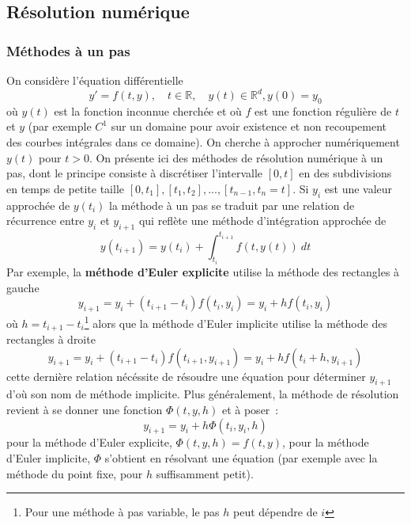 \documentclass[a4paper,11pt]{article}
\begin{document}
\begin{giacjshere}
\subsection{Résolution numérique}
\subsubsection{Méthodes à un pas}
On considère l'équation différentielle 
$$y'=f(t,y), \quad t \in \mathbb{R}, \quad y(t) \in \mathbb{R}^d, y(0)=y_0$$ 
o\`u $y(t)$ est la fonction inconnue cherchée
et où $f$ est une fonction régulière de $t$ et $y$ (par exemple
$C^1$ sur un domaine pour avoir existence et non recoupement des courbes
int\'egrales dans ce domaine).  On cherche
à approcher numériquement $y(t)$ pour $t>0$. 
On présente ici des méthodes de résolution numérique à un pas,
dont le principe consiste à discrétiser l'intervalle $[0,t]$ en des
subdivisions en temps de petite taille $[0,t_1], [t_1,t_2], ..., 
[t_{n-1},t_n=t]$. Si $y_i$ est une valeur approchée de $y(t_i)$
la méthode à un pas se traduit par une relation de récurrence entre
$y_i$ et $y_{i+1}$ qui reflète une méthode d'intégration
approchée de
$$ y(t_{i+1})=y(t_i)+\int_{t_i}^{t_{i+1}} f(t,y(t)) \ dt$$
Par exemple, la {\bf méthode d'Euler explicite} 
utilise la méthode des
rectangles à gauche
$$ y_{i+1} = y_i + (t_{i+1}-t_i) f(t_i,y_i)=y_i+hf(t_i,y_i)$$
o\`u $h=t_{i+1}-t_i$\footnote{Pour une m\'ethode \`a pas variable,
le pas $h$ peut d\'ependre de $i$} 
alors que la méthode d'Euler implicite utilise la méthode 
des rectangles à droite
$$ y_{i+1} = y_i + (t_{i+1}-t_i) f(t_{i+1},y_{i+1})=y_i+hf(t_{i}+h,y_{i+1})$$
cette dernière relation nécéssite de résoudre une équation pour
déterminer $y_{i+1}$ d'où son nom de méthode implicite.
Plus g\'en\'eralement, la m\'ethode de r\'esolution revient \`a
se donner une fonction $\Phi(t,y,h)$ et \`a poser~:
$$ y_{i+1}=y_i+h\Phi(t_i,y_i,h)$$
pour la m\'ethode d'Euler explicite, $\Phi(t,y,h)=f(t,y)$, pour
la m\'ethode d'Euler implicite, $\Phi$ s'obtient en r\'esolvant une 
\'equation (par exemple avec la m\'ethode du point fixe, pour $h$
suffisamment petit).


\end{giacjshere}
\end{document}
